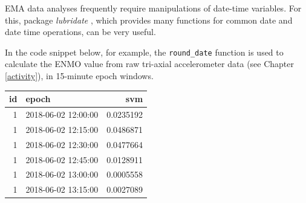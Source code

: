 \documentclass[]{book}
\newenvironment{Shaded}{\begin{snugshade}}{\end{snugshade}}
\newcommand{\KeywordTok}[1]{\textcolor[rgb]{0.13,0.29,0.53}{\textbf{#1}}}
\newcommand{\DataTypeTok}[1]{\textcolor[rgb]{0.13,0.29,0.53}{#1}}
\newcommand{\DecValTok}[1]{\textcolor[rgb]{0.00,0.00,0.81}{#1}}
\newcommand{\StringTok}[1]{\textcolor[rgb]{0.31,0.60,0.02}{#1}}
\newcommand{\CommentTok}[1]{\textcolor[rgb]{0.56,0.35,0.01}{\textit{#1}}}
\newcommand{\OperatorTok}[1]{\textcolor[rgb]{0.81,0.36,0.00}{\textbf{#1}}}
\newcommand{\NormalTok}[1]{#1}
\begin{document}
 

EMA data analyses frequently require manipulations of date-time
variables. For this, package \emph{lubridate} \citep{R-lubridate}, which
provides many functions for common date and date time operations, can be
very useful.

In the code snippet below, for example, the \texttt{round\_date}
function is used to calculate the ENMO value from raw tri-axial
accelerometer data (see Chapter \ref{activity}), in 15-minute epoch
windows.

\begin{Shaded}
\end{Shaded}

\begin{tabular}{r|l|r}
\hline
id & epoch & svm\\
\hline
1 & 2018-06-02 12:00:00 & 0.0235192\\
\hline
1 & 2018-06-02 12:15:00 & 0.0486871\\
\hline
1 & 2018-06-02 12:30:00 & 0.0477664\\
\hline
1 & 2018-06-02 12:45:00 & 0.0128911\\
\hline
1 & 2018-06-02 13:00:00 & 0.0005558\\
\hline
1 & 2018-06-02 13:15:00 & 0.0027089\\
\hline
\end{tabular}
\end{document}

